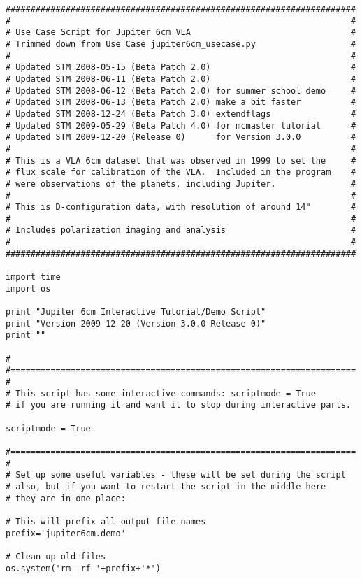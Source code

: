 \small
\begin{verbatim}
######################################################################
#                                                                    #
# Use Case Script for Jupiter 6cm VLA                                #
# Trimmed down from Use Case jupiter6cm_usecase.py                   #
#                                                                    #
# Updated STM 2008-05-15 (Beta Patch 2.0)                            #
# Updated STM 2008-06-11 (Beta Patch 2.0)                            #
# Updated STM 2008-06-12 (Beta Patch 2.0) for summer school demo     #
# Updated STM 2008-06-13 (Beta Patch 2.0) make a bit faster          #
# Updated STM 2008-12-24 (Beta Patch 3.0) extendflags                #
# Updated STM 2009-05-29 (Beta Patch 4.0) for mcmaster tutorial      #
# Updated STM 2009-12-20 (Release 0)      for Version 3.0.0          #
#                                                                    #
# This is a VLA 6cm dataset that was observed in 1999 to set the     #
# flux scale for calibration of the VLA.  Included in the program    #
# were observations of the planets, including Jupiter.               #
#                                                                    #
# This is D-configuration data, with resolution of around 14"        #
#                                                                    #
# Includes polarization imaging and analysis                         #
#                                                                    #
######################################################################

import time
import os

print "Jupiter 6cm Interactive Tutorial/Demo Script"
print "Version 2009-12-20 (Version 3.0.0 Release 0)"
print ""

# 
#=====================================================================
#
# This script has some interactive commands: scriptmode = True
# if you are running it and want it to stop during interactive parts.

scriptmode = True

#=====================================================================
#
# Set up some useful variables - these will be set during the script
# also, but if you want to restart the script in the middle here
# they are in one place:

# This will prefix all output file names
prefix='jupiter6cm.demo'

# Clean up old files
os.system('rm -rf '+prefix+'*')


\end{verbatim}
